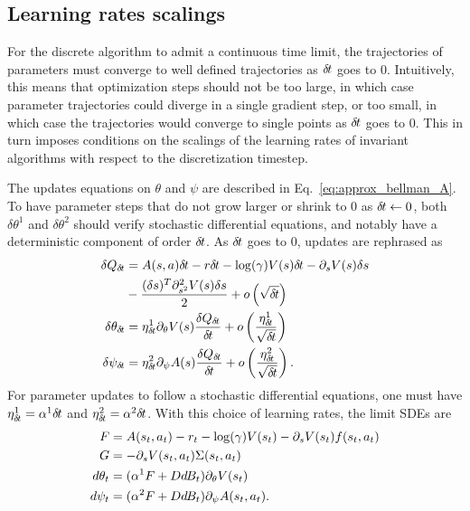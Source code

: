 \subsection{Learning rates scalings}
\label{subsec:lr}
For the discrete algorithm to admit a continuous time limit, the trajectories
of parameters must converge to well defined trajectories as ${\delta\hspace{-.1em}t}$ goes to
$0$.  Intuitively, this means that optimization steps should not be too large,
in which case parameter trajectories could diverge in a single gradient step,
or too small, in which case the trajectories would converge to single points as
${\delta\hspace{-.1em}t}$ goes to $0$.  This in turn imposes conditions on the scalings of the
learning rates of invariant algorithms with respect to the discretization
timestep.

The updates equations on $\theta$ and $\psi$ are described in
Eq.~\eqref{eq:approx_bellman_A}.  To have parameter steps that do not grow
larger or shrink to $0$ as ${\delta\hspace{-.1em}t} \leftarrow 0$, both $\delta \theta^1$ and
$\delta \theta^2$ should verify stochastic differential equations, and notably
have a deterministic component of order ${\delta\hspace{-.1em}t}$. As ${\delta\hspace{-.1em}t}$ goes to $0$,
updates are rephrased as
\begin{align}
	\delta Q_{\delta\hspace{-.1em}t} &= A(s, a){\delta\hspace{-.1em}t} - r{\delta\hspace{-.1em}t} - \log(\gamma) V(s){\delta\hspace{-.1em}t} - \partial_s V(s) \delta s\nonumber \\&- \frac{(\delta s)^T \partial_{s^2}^2 V(s) \delta s}{2} + o\left(\sqrt{{\delta\hspace{-.1em}t}}\right)\\
	\delta \theta_{\delta\hspace{-.1em}t} &= \eta^1_{\delta\hspace{-.1em}t} \partial_{\theta} V(s) \frac{\delta Q_{\delta\hspace{-.1em}t}}{{\delta\hspace{-.1em}t}} + o\left(\frac{\eta^1_{\delta\hspace{-.1em}t}}{\sqrt{{\delta\hspace{-.1em}t}}}\right)\\
	\delta \psi_{\delta\hspace{-.1em}t} &= \eta^2_{\delta\hspace{-.1em}t} \partial_{\psi} A(s) \frac{\delta Q_{\delta\hspace{-.1em}t}}{{\delta\hspace{-.1em}t}} + o\left(\frac{\eta^2_{\delta\hspace{-.1em}t}}{\sqrt{{\delta\hspace{-.1em}t}}}\right).
\end{align}
For parameter updates to follow a stochastic differential equations, one must
have $\eta^1_{\delta\hspace{-.1em}t} = \alpha^1 {\delta\hspace{-.1em}t}$ and $\eta^2_{\delta\hspace{-.1em}t} = \alpha^2
{\delta\hspace{-.1em}t}$. With this choice of learning rates, the limit SDEs are
\begin{align}
	F &= A(s_t, a_t) - r_t - \log(\gamma) V(s_t) - \partial_s V(s_t) f(s_t, a_t)\nonumber\\
	G &= - \partial_s V(s_t, a_t) \Sigma(s_t, a_t)\nonumber\\
	d\theta_t &= (\alpha^1 F  + D d\hspace{-.1em}B_t)\partial_{\theta} V(s_t)\nonumber\\
	d\psi_t &= (\alpha^2 F  + D d\hspace{-.1em}B_t)\partial_{\psi} A(s_t, a_t)\nonumber.
\end{align}
